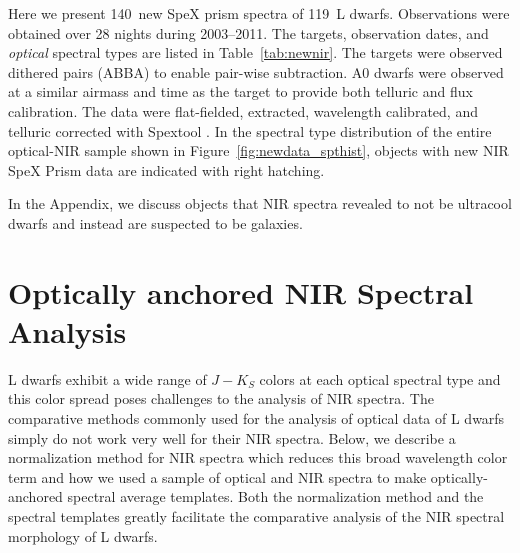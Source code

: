 \documentclass[12pt,preprint]{aastex}
\newcommand{\prismspectra}{140} %
\newcommand{\objects}{119} %
\begin{document}
Here we present \prismspectra~new SpeX prism spectra of \objects~L dwarfs. 
Observations were obtained over 28 nights during 2003--2011. The targets, observation dates, and \emph{optical} spectral types are listed in Table~\ref{tab:newnir}. 
The targets were observed dithered pairs (ABBA) to enable pair-wise subtraction. A0 dwarfs were observed at a similar airmass and time as the target to provide both telluric and flux calibration.
The data were flat-fielded, extracted, wavelength calibrated, and telluric corrected with Spextool \citep{Cushing04,Spextool2}.
In the spectral type distribution of the entire optical-NIR sample shown in Figure~\ref{fig:newdata_spthist}, objects with new NIR SpeX Prism data are indicated with right hatching.

In the Appendix, we discuss objects that NIR spectra revealed to not be ultracool dwarfs and instead are suspected to be galaxies.


\clearpage
\section{Optically anchored NIR Spectral Analysis}

L dwarfs exhibit a wide range of $J-K_S$ colors at each optical spectral type \cite[e.g.,]{Schmidt10, Faherty:2012cy} and this color spread poses challenges to the analysis of NIR spectra. The comparative methods commonly used for the analysis of optical data of L dwarfs simply do not work very well for their NIR spectra.
Below, we describe a normalization method for NIR spectra which reduces this broad wavelength color term and how we used a sample of optical and NIR spectra to make optically-anchored spectral average templates. 
Both the normalization method and the spectral templates greatly facilitate the comparative analysis of the NIR spectral morphology of L dwarfs.
\end{document}
